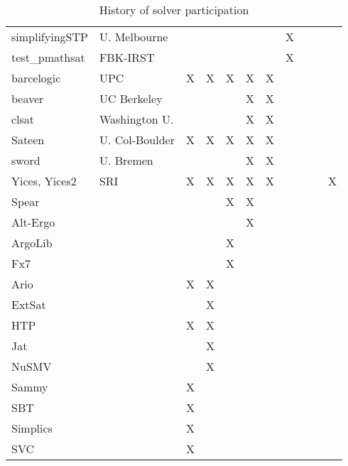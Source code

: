 \documentclass[twosize,11pt]{article}
\begin{document}
\begin{table}[t]
\begin{tabular}{|l|l|c|c|c|c|c|c|c|c|c|}
simplifyingSTP         & U. Melbourne   &   &   &   &   &   & X &   &   &   \\	
test\_pmathsat         & FBK-IRST       &   &   &   &   &   & X &   &   &   \\	
barcelogic             & UPC            & X & X & X & X & X &   &   &   &   \\	
beaver                 & UC Berkeley   &   &   &   & X & X &   &   &   &   \\		
clsat                  & Washington U.  &   &   &   & X & X &   &   &   &   \\		
Sateen                 & U. Col-Boulder & X & X & X & X & X &   &   &   &   \\		
sword                  & U. Bremen      &   &   &   & X & X &   &   &   &   \\		
Yices, Yices2          & SRI            & X & X & X & X & X &   &   &   & X \\		
Spear                  &   &   &   & X & X &   &   &   &   \\		
Alt-Ergo               &   &   &   &   & X &   &   &   &   \\			
ArgoLib                &   &   &   & X &   &   &   &   &   \\				
Fx7                    &   &   &   & X &   &   &   &   &   \\				
Ario                   &   & X & X &   &   &   &   &   &   \\					
ExtSat                 &   &   & X &   &   &   &   &   &   \\					
HTP                    &   & X & X &   &   &   &   &   &   \\					
Jat                    &   &   & X &   &   &   &   &   &   \\					
NuSMV                  &   &   & X &   &   &   &   &   &   \\					
Sammy                  &   & X &   &   &   &   &   &   &   \\						
SBT                    &   & X &   &   &   &   &   &   &   \\						
Simplics               &   & X &   &   &   &   &   &   &   \\					
SVC	                   &   & X &   &   &   &   &   &   &   \\	
\hline					
\end{tabular}
\vspace{.2in}
\caption{History of solver participation}
\label{Table:participants}
\end{table}
\end{document}
